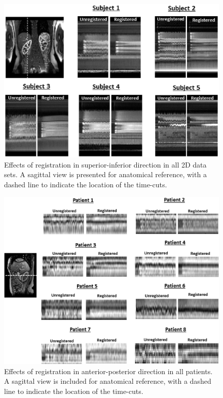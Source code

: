 \documentclass[num-refs]{wiley-article}
\begin{document}
\begin{figure}[tb!]
	\begin{center}
		\includegraphics[width=\textwidth]{Figures/6.eps}
		\caption{ Effects of registration in superior-inferior direction in all 2D data sets. A sagittal view is presented for anatomical reference, with a dashed line to indicate the location of the time-cuts.}
	\end{center}
\end{figure}

\begin{figure}[tb!]
	\begin{center}
		\includegraphics[width=\textwidth]{Figures/7.eps}
		\caption{ Effects of registration in anterior-posterior direction in all patients. A sagittal view is included for anatomical reference, with a dashed line to indicate the location of the time-cuts.}
	\end{center}
\end{figure}
\end{document}
